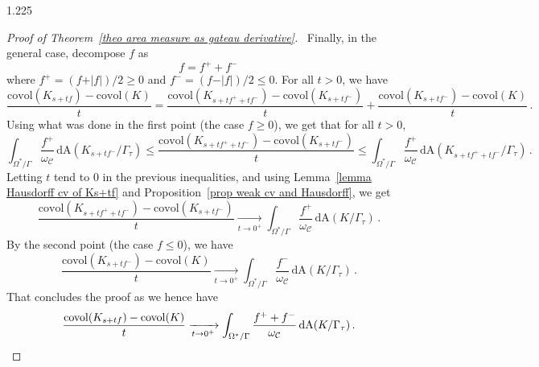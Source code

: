 \documentclass[reqno, a4paper]{amsart}
\numberwithin{equation}{section}
\numberwithin{figure}{section}
\theoremstyle{definition}
\theoremstyle{remark}
\newcommand{\dif}{\mathrm{d}} %
\newcommand{\C}{\mathcal{C}} %
\newcommand{\covol}{\mathrm{covol}} %
\newcommand{\Area}{\mathrm{A}} %
\begin{document}
\begin{spacing}{1.225}
\begin{proof}[Proof of Theorem~\ref{theo area measure as gateau derivative}]
\noindent \textbullet\ Finally, in the general case, decompose $f$ as 
\begin{equation*}
 f= f^++f^- \,
\end{equation*}
where $f^+ = (f + \vert f\vert)/2 \geq 0$ and $f^- = (f - \vert f\vert)/2 \leq 0$. For all $t>0$, we have
\begin{equation*}
 \frac{\covol (K_{s+tf})-\covol(K)}{t} = \frac{\covol (K_{s+tf^{+} +t f^{-}})-\covol(K_{s+tf^{-}})}{t} + \frac{\covol (K_{s+tf^{-}})-\covol(K)}{t} \, . 
\end{equation*}
Using what was done in the first point (the case $f\geq0$), we get that for all $t>0$,
\begin{equation*}
\int_{\Omega^*/\Gamma} \frac{f^+}{\omega_\C} \, \dif \Area(K_{s+tf^-}/\Gamma_\tau) \leq \frac{\covol (K_{s+tf^+ +tf^-})-\covol(K_{s+tf^-})}{t} \leq \int_{\Omega^*/\Gamma} \frac{f^+}{\omega_\C} \, \dif \Area(K_{s + tf^+ + tf^-}/\Gamma_\tau) \, . 
\end{equation*}
Letting $t$ tend to $0$ in the previous inequalities, and using Lemma~\ref{lemma Hausdorff cv of Ks+tf} and Proposition~\ref{prop weak cv and Hausdorff}, we get
\begin{equation*}
\frac{\covol (K_{s+tf^{+} +t f^{-}})-\covol (K_{s+tf^-})}{t}\xrightarrow[t \to 0^+]{} \int_{\Omega^*/\Gamma} \frac{f^+}{\omega_\C} \, \dif \Area(K/\Gamma_\tau) \, . 
\end{equation*}
By the second point (the case $f\leq0$), we have
\begin{equation*}
\frac{\covol (K_{s+tf^{-}})-\covol(K)}{t} \xrightarrow[t \to 0^+]{} \int_{\Omega^*/\Gamma} \frac{f^-}{\omega_\C}\, \dif \Area(K/\Gamma_\tau) \, . 
\end{equation*}
That concludes the proof as we hence have 
\begin{equation*}
\frac{\covol (K_{s+tf})-\covol(K)}{t}\xrightarrow[t \to 0^+]{} \int_{\Omega^*/\Gamma} \frac{f^+ + f^-}{\omega_\C} \, \dif \Area(K/\Gamma_\tau) \, . \qedhere
\end{equation*}
\end{proof}


\end{spacing}
\end{document}
